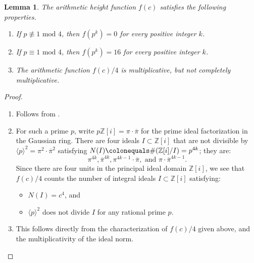 \documentclass[12pt]{amsart}
\newcounter{counter}[section] %
\numberwithin{equation}{section} %
\newtheorem{lemma}[counter]{Lemma}
\theoremstyle{definition} \newtheorem{definition}[counter]{Definition}
\theoremstyle{remark} \newtheorem{nonexam}[counter]{Non-example}
\newcommand{\ZZ}{\mathbb{Z}} %
\newcommand{\md}{\text{ mod }} %
\begin{document}
\begin{lemma}
  \label{lemma:arithmetic-height-fun-f}
    The arithmetic height function $f(c)$ satisfies the following properties.
    \begin{enumerate}
        \item If $p \not\equiv 1 \md 4$, then $f(p^k) = 0$ for every positive integer $k$.
        \item If $p \equiv 1 \md 4$, then $f(p^k) = 16$ for every positive integer $k$.
        \item The arithmetic function $f(c)/4$ is multiplicative, but not
          completely multiplicative.
    \end{enumerate}
\end{lemma}
\begin{proof}
    \hfill
    \begin{enumerate}
        \item Follows from .
        \item For such a prime $p$, write $p\ZZ[i] = \pi\cdot\overline{\pi}$
          for the prime ideal factorization in the Gaussian ring. There are
          four ideals $I \subset \ZZ[i]$ that are not divisible by
          $\langle p \rangle^2 = \pi^2\cdot\overline{\pi}^2$ satisfying
          $N(I) \colonequals \#(\ZZ[i]/I) = p^{4k}$; they are:
        \begin{equation*}
          \pi^{4k}, \overline{\pi}^{4k}, \pi^{4k-1}\cdot\overline{\pi},
          \text{ and } \pi\cdot\overline{\pi}^{4k-1}.
        \end{equation*}
        Since there are four units in the principal ideal domain $\ZZ[i]$,
        we see that $f(c)/4$ counts the number of integral ideals $I \subset
        \ZZ[i]$ satisfying:
        \begin{itemize}
          \item $N(I) = c^4$, and
          \item $\langle p \rangle^2$ does not divide $I$ for any rational prime $p$.
        \end{itemize}
        \item This follows directly from the characterization of $f(c)/4$ given
          above, and the multiplicativity of the ideal norm.
    \end{enumerate}
\end{proof}
\end{document}
